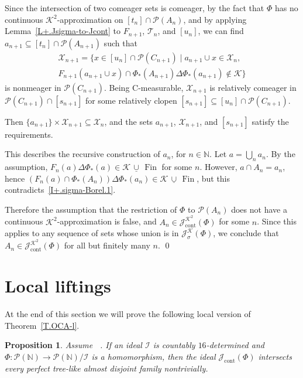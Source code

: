 \documentclass{amsart}
\makeatletter
\def\p{{\mathcal P}}              %
\def\N{\mathbb N}                        %
\def\Fin{{\rm Fin}}   %
\newtheorem{proposition}{Proposition}[section]
\theoremstyle{definition}
\theoremstyle{remark}
\newcommand{\ucup}{\,\underline{\cup}\,}
\def\Fin{\operatorname{Fin}}
\DeclareMathOperator{\Ccont}{cont}
\newcommand{\Jcont}{\cJ_{\Ccont}}
\newcommand{\Jsigma}{\cJ_\sigma}
\newcommand{\cK}{{\mathcal K}}
\renewcommand{\proofname}{Proof}
\renewenvironment{proof}[1][\proofname]{\par
\let\oldqedsymbol\qedsymbol             %
  \normalfont
  \topsep6\p@\@plus6\p@ \trivlist
  \item[\hskip\labelsep\hskip\parindent\scshape
    #1\@addpunct{.}]\ignorespaces
}{%
  \qed\endtrivlist
\global\let\qedsymbol\oldqedsymbol      %
}
\newcommand{\cP}{\mathcal P}
\newcommand{\bbN}{\mathbb N}
\newcommand{\cI}{{\mathcal I}} %
\newcommand{\cJ}{{\mathcal J}} %
\newcommand{\cT}{\mathcal T}
\newcommand{\cX}{\mathcal X}
\DeclareMathOperator{\OCAT}{OCA_T}
\numberwithin{claim}{subsection}
\makeatother
\begin{document}
\begin{proof}[Proof of Proposition~\ref{P+.Jsigma-to-Jcont}]
	Since the intersection of two comeager sets is comeager, by the fact that $\Phi$ has no continuous $\cK^2$-approximation on $[t_n]\cap \cP(A_n)$, and by applying Lemma~\ref{L+.Jsigma-to-Jcont} to $F_{n+1}$,  $\cT_n$, and $[u_n]$,  we can find $a_{n+1}\subseteq [t_n]\cap \cP(A_{n+1})$ such that 
	\begin{multline*}
		\cX_{n+1}=\{x\in [u_n]\cap \cP(C_{n+1})\mid a_{n+1}\cup  x\in \cX_n,\\ F_{n+1}(a_{n+1}\cup x)\cap \Phi_*(A_{n+1})\Delta  \Phi_*(a_{n+1})\notin \cK\}
	\end{multline*}
	is nonmeager in $\cP(C_{n+1})$. Being C-measurable, $\cX_{n+1}$ is relatively comeager in $\cP(C_{n+1})\cap [s_{n+1}]$ for some relatively clopen $[s_{n+1}]\subseteq [u_n]\cap \cP(C_{n+1})$.  
	
	Then $\{a_{n+1}\}\times \cX_{n+1}\subseteq \cX_n$, and the sets $a_{n+1}$, $\cX_{n+1}$, and $[s_{n+1}]$ satisfy the requirements. 
	
	This describes the recursive construction of $a_n$, for $n\in \bbN$.  Let $a=\bigcup_n a_n$. By the assumption, $F_n(a)\Delta  \Phi_*(a)\in \cK\ucup \Fin$ for some $n$. However, $a\cap A_n=a_n$, hence $(F_n(a)\cap \Phi_*(A_n))\Delta  \Phi_*(a_n)\in \cK\ucup \Fin$,  but this contradicts~\eqref{I+.sigma-Borel.1}. 
	
	Therefore the assumption that the restriction of $\Phi$ to $\cP(A_n)$ does not have a continuous $\cK^2$-approximation is false, and $A_n\in \Jcont^{\cK^2}(\Phi)$ for some $n$.  Since this applies to any sequence of sets whose union is in $\Jsigma^\cK(\Phi)$, we conclude that $A_n\in \Jcont^{\cK^2}(\Phi)$ for all but finitely many $n$. 
\end{proof}



\section{Local liftings}


At the end of this section we will prove the following local version of Theorem~\ref{T.OCA-l}. 

\begin{proposition} %
	\label{P.general.Jcont.nonmeager}
	Assume  $\OCAT$.
	If an ideal $\cI$ is countably $16$-determined   and $\Phi\colon \p(\N)\to \p(\N)/\cI$
	is a  homomorphism, then the ideal $\Jcont(\Phi)$ intersects every perfect tree-like almost disjoint family nontrivially. 
\end{proposition}
\end{document}
